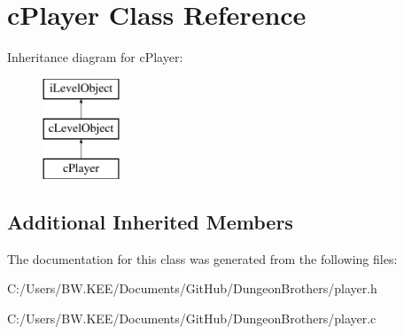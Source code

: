 \hypertarget{classc_player}{\section{c\-Player Class Reference}
\label{classc_player}
}
Inheritance diagram for c\-Player\-:\begin{figure}[H]
\begin{center}
\leavevmode
\includegraphics[height=3.000000cm]{classc_player}
\end{center}
\end{figure}
\subsection*{Additional Inherited Members}


The documentation for this class was generated from the following files\-:\begin{DoxyCompactItemize}
\item 
C\-:/\-Users/\-B\-W.\-K\-E\-E/\-Documents/\-Git\-Hub/\-Dungeon\-Brothers/player.\-h\item 
C\-:/\-Users/\-B\-W.\-K\-E\-E/\-Documents/\-Git\-Hub/\-Dungeon\-Brothers/player.\-c\end{DoxyCompactItemize}
